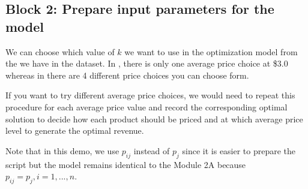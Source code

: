 \documentclass[letterpaper,10pt,english]{jupyterBook}
\begin{document}
\subsection{Block 2: Prepare input parameters for the model}
\label{\detokenize{docs/Case1_5_Module2B_Retail_Price_Optimization_Script:block-2-prepare-input-parameters-for-the-model}}
\sphinxAtStartPar
We can choose which value of \(k\) we want to use in the optimization model from the  we have in the dataset. In , there is only one average price choice at \$3.0 whereas in  there are 4 different price choices you can choose form.

\sphinxAtStartPar
If you want to try different average price choices, we would need to repeat this procedure for each average price value and record the corresponding optimal solution to decide how each product should be priced and at which average price level to generate the optimal revenue.

\sphinxAtStartPar
Note that in this demo, we use \(p_{ij}\) instead of \(p_{j}\) since it is easier to prepare the script but the model remains identical to the Module 2A because \(p_{ij} = p_{j},i=1,...,n\).
\end{document}
